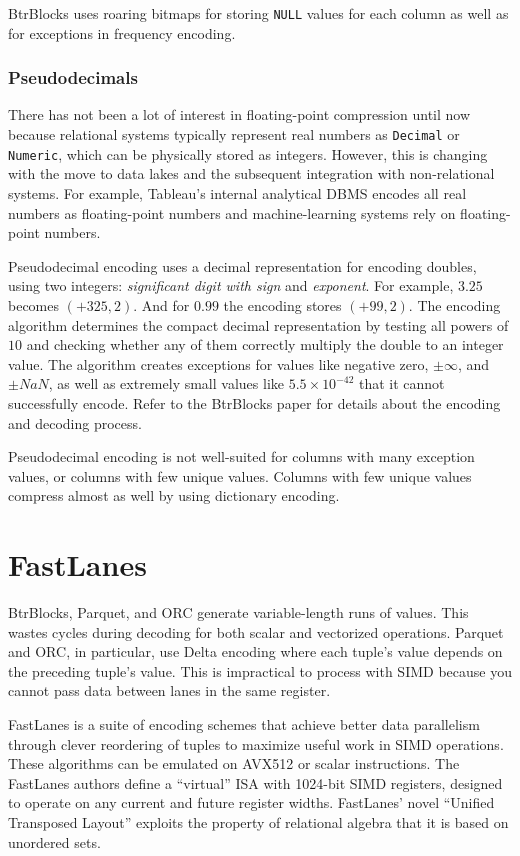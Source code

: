 \documentclass[11pt]{article}
\begin{document}
BtrBlocks uses roaring bitmaps for storing \texttt{NULL} values for each column as well as for exceptions in frequency encoding.

\subsubsection{Pseudodecimals}\label{sec:pseudo}
There has not been a lot of interest in floating-point compression until now because relational systems typically represent real numbers as \texttt{Decimal} or \texttt{Numeric}, which can be physically stored as integers. However, this is changing with the move to data lakes and the subsequent integration with non-relational systems. For example, Tableau's internal analytical DBMS encodes all real numbers as floating-point numbers and machine-learning systems rely on floating-point numbers.

Pseudodecimal encoding uses a decimal representation for encoding doubles, using two integers: \textit{significant digit with sign} and \textit{exponent}. For example, $3.25$ becomes $(+325, 2)$. And for $0.99$ the encoding stores $(+99,2)$. The encoding algorithm determines the compact decimal representation by testing all powers of $10$ and checking whether any of them correctly multiply the double to an integer value. The algorithm creates exceptions for values like negative zero, $\pm\infty$, and $\pm NaN$, as well as extremely small values like $5.5\times 10^{-42}$ that it cannot successfully encode. Refer to the BtrBlocks paper for details about the encoding and decoding process.

Pseudodecimal encoding is not well-suited for columns with many exception values, or columns with few unique values. Columns with few unique values compress almost as well by using dictionary encoding.
\section{FastLanes}
BtrBlocks, Parquet, and ORC generate variable-length runs of values. This wastes cycles during decoding for both scalar and vectorized operations. Parquet and ORC, in particular, use Delta encoding where each tuple's value depends on the preceding tuple's value. This is impractical to process with SIMD because you cannot pass data between lanes in the same register.

FastLanes is a suite of encoding schemes that achieve better data parallelism through clever reordering of tuples to maximize useful work in SIMD operations. These algorithms can be emulated on AVX512 or scalar instructions. The FastLanes authors define a ``virtual'' ISA with 1024-bit SIMD registers, designed to operate on any current and future register widths. FastLanes' novel ``Unified Transposed Layout'' exploits the property of relational algebra that it is based on unordered sets.
\end{document}
